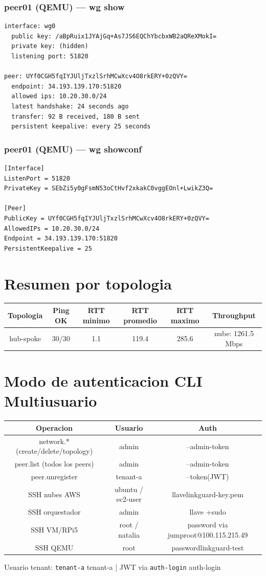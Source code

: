 \documentclass[11pt,a4paper]{article}
\begin{document}
\subsubsection*{peer01 (QEMU) — wg show}
\begin{lstlisting}
interface: wg0
  public key: /aBpRuix1JYAjGq+As7JS6EQChYbcbxWB2aQReXMokI=
  private key: (hidden)
  listening port: 51820

peer: UYf0CGH5fqIYJUljTxzlSrhMCwXcv4O8rkERY+0zQVY=
  endpoint: 34.193.139.170:51820
  allowed ips: 10.20.30.0/24
  latest handshake: 24 seconds ago
  transfer: 92 B received, 180 B sent
  persistent keepalive: every 25 seconds

\end{lstlisting}

\subsubsection*{peer01 (QEMU) — wg showconf}
\begin{lstlisting}
[Interface]
ListenPort = 51820
PrivateKey = SEbZi5y0gFsmN53oCtHvf2xkakC0vggEOnl+LwikZ3Q=

[Peer]
PublicKey = UYf0CGH5fqIYJUljTxzlSrhMCwXcv4O8rkERY+0zQVY=
AllowedIPs = 10.20.30.0/24
Endpoint = 34.193.139.170:51820
PersistentKeepalive = 25

\end{lstlisting}

\section{Resumen por topologia}
\begin{longtable}{|c|c|c|c|c|c|}
\hline
Topologia & Ping OK & RTT minimo & RTT promedio & RTT maximo & Throughput \\ \hline
hub-spoke & 30/30 & 1.1 & 119.4 & 285.6 & nube: 1261.5 Mbps \\ \hline
\end{longtable}

\section{Modo de autenticacion CLI Multiusuario}
\begin{longtable}{|c|c|c|}
\hline
Operacion & Usuario & Auth \\ \hline
network.* (create/delete/topology) & admin & --admin-token \\ \hline
peer.list (todos los peers) & admin & --admin-token \\ \hline
peer.unregister & tenant-a & --token(JWT) \\ \hline
SSH nubes AWS & ubuntu / ec2-user & llavelinkguard-key.pem \\ \hline
SSH orquestador & admin & llave +sudo \\ \hline
SSH VM/RPi5 & root / natalia & password via jumproot@100.115.215.49 \\ \hline
SSH QEMU & root & passwordlinkguard-test \\ \hline
\end{longtable}

Usuario tenant:  \texttt{tenant-a} tenant-a  | JWT via  \texttt{auth-login} auth-login\\
\end{document}
